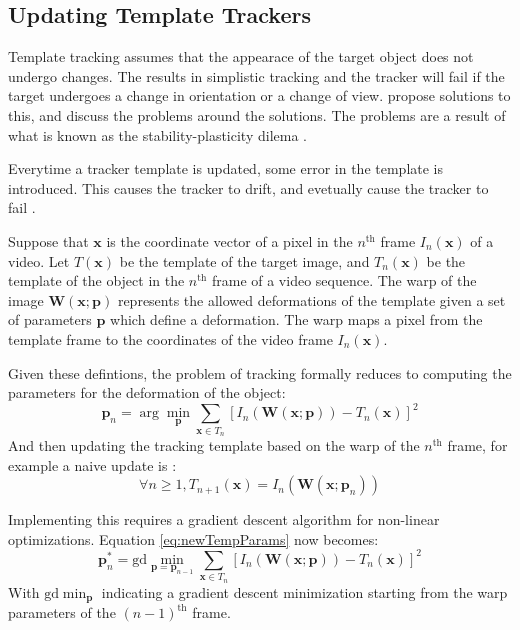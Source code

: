 \subsection{Updating Template Trackers}
  Template tracking \cite{templateUpdate} assumes that the appearace of the target object does not undergo changes.
  The results in simplistic tracking and the tracker will fail if the target undergoes a change in orientation or a change of view.
  \citeauthor{templateUpdate} propose solutions to this, and discuss the problems around the solutions.
  The problems are a result of what is known as the stability-plasticity dilema \cite{grossberg1987}.

  Everytime a tracker template is updated, some error in the template is introduced.
  This causes the tracker to drift, and evetually cause the tracker to fail \cite{templateUpdate}.

  Suppose that $\mathbf{x}$ is the coordinate vector of a pixel in the $n^{\text{th}}$ frame $I_n(\mathbf{x})$ of a video.
  Let $T(\mathbf{x})$ be the template of the target image, and $T_n(\mathbf{x})$ be the template of the object in the $n^\text{th}$ frame of a video sequence.
  The warp of the image $\mathbf{W}(\mathbf{x};\mathbf{p})$ represents the allowed deformations of the template given a set of parameters $\mathbf{p}$ which define a deformation.
  The warp maps a pixel from the template frame to the coordinates of the video frame $I_n(\mathbf{x})$.

  Given these defintions, the problem of tracking formally reduces to computing the parameters for the deformation of the object:
  \begin{equation}
    \mathbf{p}_n = \arg \min_\mathbf{p} \sum_{\mathbf{x} \in T_n}\left[I_n(\mathbf{W}(\mathbf{x};\mathbf{p})) - T_n(\mathbf{x})\right]^2
    \label{eq:newTempParams}
  \end{equation}
  And then updating the tracking template based on the warp of the $n^\text{th}$ frame, for example a naive update is \cite{templateUpdate}:
  \begin{equation*}
    \forall n \geq 1, T_{n+1}(\mathbf{x}) = I_n(\mathbf{W}(\mathbf{x};\mathbf{p}_n))
  \end{equation*}

  Implementing this requires a gradient descent algorithm for non-linear optimizations.
  Equation \ref{eq:newTempParams} now becomes:
  \begin{equation}
    \mathbf{p}_n^* = \mathrm{gd} \min_{\mathbf{p} = \mathbf{p}_{n-1}} \sum_{\mathbf{x} \in T_n}\left[I_n(\mathbf{W}(\mathbf{x};\mathbf{p})) - T_n(\mathbf{x})\right]^2
    \label{eq:paramUpdate}
  \end{equation}
  With $\mathrm{gd} \min_{\mathbf{p}}$ indicating a gradient descent minimization starting from the warp parameters of the $(n-1)^\text{th}$ frame.
  
